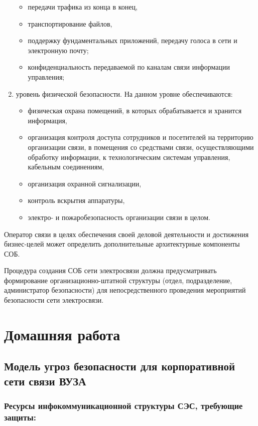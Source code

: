 \documentclass[12pt, russian, oneside, article]{ncc}
\begin{document}
\begin{enumerate}
\begin{itemize}
\item передачи трафика из конца в конец,
\item транспортирование файлов,
\item поддержку фундаментальных приложений, передачу голоса в сети и электронную почту;
\item конфиденциальность передаваемой по каналам связи информации управления;
\end{itemize}

\item уровень физической безопасности. На данном уровне обеспечиваются:

\begin{itemize}
\item физическая охрана помещений, в которых обрабатывается и хранится информация,
\item организация контроля доступа сотрудников и посетителей на территорию организации связи, в помещения со средствами связи, осуществляющими обработку информации, к технологическим системам управления, кабельным соединениям,
\item организация охранной сигнализации,
\item контроль вскрытия аппаратуры,
\item электро- и пожаробезопасность организации связи в целом.
\end{itemize}

\end{enumerate}

Оператор связи в целях обеспечения своей деловой деятельности и достижения бизнес-целей может определить дополнительные архитектурные компоненты СОБ.

Процедура создания СОБ сети электросвязи должна предусматривать формирование организационно-штатной структуры (отдел, подразделение, администратор безопасности) для непосредственного проведения мероприятий безопасности сети электросвязи.
\section{Домашняя работа}
\label{sec-2}
\subsection{Модель угроз безопасности для корпоративной сети связи ВУЗА}
\label{sec-2_1}
\subsubsection{Ресурсы инфокоммуникационной структуры СЭС, требующие защиты:}
\label{sec-2_1_1}
\end{document}
